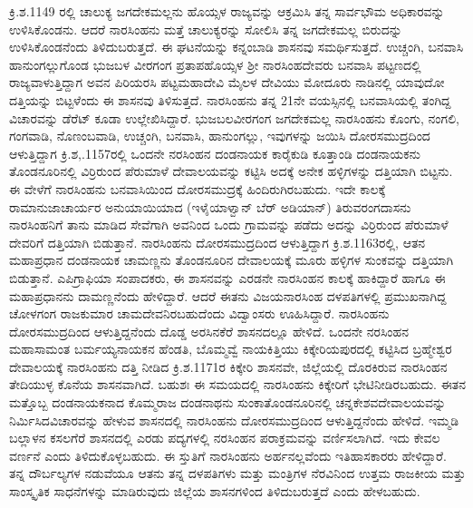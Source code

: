 ಕ್ರಿ.ಶ.1149 ರಲ್ಲಿ ಚಾಲುಕ್ಯ ಜಗದೇಕಮಲ್ಲನು ಹೊಯ್ಸಳ ರಾಜ್ಯವನ್ನು ಆಕ್ರಮಿಸಿ ತನ್ನ ಸಾರ್ವಭೌಮ ಅಧಿಕಾರವನ್ನು ಉಳಿಸಿಕೊಂಡನು. ಆದರೆ ನಾರಸಿಂಹನು ಮತ್ತೆ ಚಾಲುಕ್ಯರನ್ನು ಸೋಲಿಸಿ ತನ್ನ ಜಗದೇಕಮಲ್ಲ ಬಿರುದನ್ನು ಉಳಿಸಿಕೊಂಡನೆಂದು ತಿಳಿದುಬರುತ್ತದೆ. ಈ ಘಟನೆಯನ್ನು ಕನ್ನಂಬಾಡಿ ಶಾಸನವು ಸಮರ್ಥಿಸುತ್ತದೆ. ಉಚ್ಚಂಗಿ, ಬನವಾಸಿ ಹಾನುಂಗಲ್ಲುಗೊಂಡ ಭುಜಬಳ ವೀರಗಂಗ ಪ್ರತಾಪಹೊಯ್ಸಳ ಶ‍್ರೀ ನಾರಸಿಂಹದೇವರು ಬನವಾಸಿ ಪಟ್ಟಣದಲ್ಲಿ ರಾಜ್ಯವಾಳುತ್ತಿದ್ದಾಗ ಅವನ ಪಿರಿಯರಸಿ ಪಟ್ಟಮಹಾದೇವಿ ಮೈಲಳ ದೇವಿಯು ಮೋದೂರು ನಾಡಿನಲ್ಲಿ ಯಾವುದೋ ದತ್ತಿಯನ್ನು ಬಿಟ್ಟಳೆಂದು ಈ ಶಾಸನವು ತಿಳಿಸುತ್ತದೆ. ನಾರಸಿಂಹನು ತನ್ನ 21ನೇ ವಯಸ್ಸಿನಲ್ಲಿ ಬನವಾಸಿಯಲ್ಲಿ ತಂಗಿದ್ದ ವಿಚಾರವನ್ನು ಡೆರೆಟ್​ ಕೂಡಾ ಉಲ್ಲೇಖಿಸಿದ್ದಾರೆ. ಭುಜಬಲವೀರಗಂಗ ಜಗದೇಕಮಲ್ಲ ನಾರಸಿಂಹನು ಕೊಂಗು, ನಂಗಲಿ, ಗಂಗವಾಡಿ, ನೊಣಂಬವಾಡಿ, ಉಚ್ಚಂಗಿ, ಬನವಾಸಿ, ಹಾನುಂಗಲ್ಲು, ಇವುಗಳನ್ನು ಜಯಿಸಿ ದೋರಸಮುದ್ರದಿಂದ ಆಳುತ್ತಿದ್ದಾಗ ಕ್ರಿ.ಶ,.1157ರಲ್ಲಿ ಒಂದನೇ ನರಸಿಂಹನ ದಂಡನಾಯಕ ಕಾರೈಕುಡಿ ಕೂತ್ತಾಂಡಿ ದಂಡನಾಯಕನು ತೊಂಡನೂರಿನಲ್ಲಿ ವಿರ್ರಿರುಂದ ಪೆರುಮಾಳೆ ದೇವಾಲಯ\-ವನ್ನು ಕಟ್ಟಿಸಿ ಅದಕ್ಕೆ ಅನೇಕ ಹಳ್ಳಿಗಳನ್ನು ದತ್ತಿಯಾಗಿ ಬಿಟ್ಟನು. ಈ ವೇಳೆಗೆ ನಾರಸಿಂಹನು ಬನವಾಸಿಯಿಂದ ದೋರಸಮುದ್ರಕ್ಕೆ ಹಿಂದಿರುಗಿರಬಹುದು. ಇದೇ ಕಾಲಕ್ಕೆ ರಾಮಾನುಜಾಚಾರ್ಯರ ಅನುಯಾಯಿಯಾದ (ಇಳೈಯಾಳ್ವಾನ್​ ಬೆರ್‌ ಅಡಿಯಾನ್​) ತಿರುವರಂಗದಾಸನು ನಾರಸಿಂಹನಿಗೆ ತಾನು ಮಾಡಿದ ಸೇವೆಗಾಗಿ ಅವನಿಂದ ಒಂದು ಗ್ರಾಮವನ್ನು ಪಡೆದು ಅದನ್ನು ವಿರ್ರಿರುಂದ ಪೆರುಮಾಳೆ ದೇವರಿಗೆ ದತ್ತಿಯಾಗಿ ಬಿಡುತ್ತಾನೆ. ನಾರಸಿಂಹನು ದೋರಸಮುದ್ರದಿಂದ ಆಳುತ್ತಿದ್ದಾಗ ಕ್ರಿ.ಶ.1163ರಲ್ಲಿ, ಆತನ ಮಹಾಪ್ರಧಾನ ದಂಡನಾಯಕ ಚಾಮಣ್ಣನು ತೊಂಡನೂರಿನ ದೇವಾಲಯಕ್ಕೆ ಮೂರು ಹಳ್ಳಿಗಳ ಸುಂಕವನ್ನು ದತ್ತಿಯಾಗಿ ಬಿಡುತ್ತಾನೆ. ಎಪಿಗ್ರಾಫಿಯಾ ಸಂಪಾದಕರು, ಈ ಶಾಸನವನ್ನು ಎರಡನೇ ನಾರಸಿಂಹನ ಕಾಲಕ್ಕೆ ಹಾಕಿದ್ದಾರೆ ಹಾಗೂ ಈ ಮಹಾಪ್ರಧಾನನು ದಾಮಣ್ಣನೆಂದು ಹೇಳಿದ್ದಾರೆ. ಆದರೆ ಈತನು ವಿಜಯನಾರಸಿಂಹ ದಳಪತಿಗಳಲ್ಲಿ ಪ್ರಮುಖನಾಗಿದ್ದ ಚೋಳಗಂಗ ರಾಜಕುಮಾರ ಚಾಮದೇವನಿರಬಹುದೆಂದು ವಿದ್ವಾಂಸರು ಊಹಿಸಿದ್ದಾರೆ. ನಾರಸಿಂಹನು ದೋರಸಮುದ್ರದಿಂದ ಆಳುತ್ತಿದ್ದನೆಂದು ದೊಡ್ಡ ಅರಸಿನಕೆರೆ ಶಾಸನದಲ್ಲೂ ಹೇಳಿದೆ. ಒಂದನೇ ನರಸಿಂಹನ ಮಹಾಸಾಮಂತ ಬರ್ಮಯ್ಯನಾಯಕನ ಹೆಂಡತಿ, ಬೊಮ್ಮವ್ವೆ ನಾಯಕಿತ್ತಿಯು ಕಿಕ್ಕೇರಿಯಪುರದಲ್ಲಿ ಕಟ್ಟಿಸಿದ ಬ್ರಹ್ಮೇಶ್ವರ ದೇವಾಲಯಕ್ಕೆ ನಾರಸಿಂಹನು ದತ್ತಿ ನೀಡಿದ ಕ್ರಿ.ಶ.1171ರ ಕಿಕ್ಕೇರಿ ಶಾಸನವೇ, ಜಿಲ್ಲೆಯಲ್ಲಿ ದೊರಕಿರುವ ನಾರಸಿಂಹನ ತೇದಿಯುಳ್ಳ ಕೊನೆಯ ಶಾಸನವಾಗಿದೆ. ಬಹುಶಃ ಈ ಸಮಯದಲ್ಲಿ ನಾರಸಿಂಹನು ಕಿಕ್ಕೇರಿಗೆ ಭೇಟಿನೀಡಿರಬಹುದು. ಈತನ ಮತ್ತೊಬ್ಬ ದಂಡನಾಯಕನಾದ ಕೊಮ್ಮರಾಜ ದಂಡನಾಥನು ಸುಂಕಾತೊಂಡನೂರಿನಲ್ಲಿ ಚನ್ನಕೇಶವದೇವಾಲಯವನ್ನು ನಿರ್ಮಿಸಿದ\break ವಿಚಾರವನ್ನು ಹೇಳುವ ಶಾಸನದಲ್ಲಿ ನಾರಸಿಂಹನು ದೋರಸಮುದ್ರದಿಂದ ಆಳುತ್ತಿದ್ದನೆಂದು ಹೇಳಿದೆ. ಇಮ್ಮಡಿ ಬಲ್ಲಾಳನ ಕಸಲಗೆರೆ ಶಾಸನದಲ್ಲಿ ಎರಡು ಪದ್ಯಗಳಲ್ಲಿ ನರಸಿಂಹನ ಪರಾಕ್ರಮವನ್ನು ವರ್ಣಿಸಲಾಗಿದೆ. ಇದು ಕೇವಲ ವರ್ಣನೆ ಎಂದು ತಿಳಿದುಕೊಳ್ಳಬಹುದು. ಈ ಸ್ತುತಿಗೆ ನಾರಸಿಂಹನು ಅರ್ಹನಲ್ಲವೆಂದು ಇತಿಹಾಸಕಾರರು ಹೇಳಿದ್ದಾರೆ. ತನ್ನ ದೌರ್ಬಲ್ಯಗಳ ನಡುವೆಯೂ ಆತನು ತನ್ನ ದಳಪತಿಗಳು ಮತ್ತು ಮಂತ್ರಿಗಳ ನೆರವಿನಿಂದ ಉತ್ತಮ ರಾಜಕೀಯ ಮತ್ತು ಸಾಂಸ್ಕೃತಿಕ ಸಾಧನೆಗಳನ್ನು ಮಾಡಿರುವುದು ಜಿಲ್ಲೆಯ ಶಾಸನಗಳಿಂದ ತಿಳಿದುಬರುತ್ತದೆ ಎಂದು ಹೇಳಬಹುದು.

